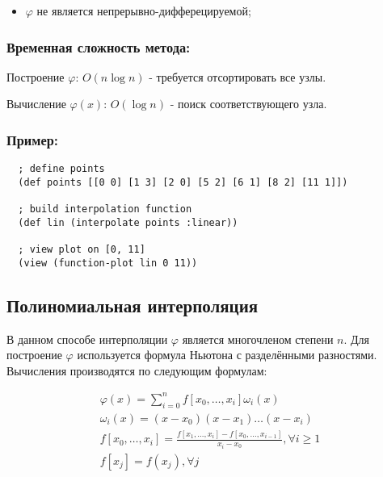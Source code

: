 \begin{itemize}
\item $\varphi$ не является непрерывно-дифферецируемой;
\end{itemize}

\subsubsection{Временная сложность метода:}

Построение $\varphi$: $ O(n \log n)$ - требуется отсортировать все узлы.

Вычисление $\varphi(x)$: $O(\log n)$ - поиск соответствующего узла.

\subsubsection{Пример:}

\begin{verbatim}
  ; define points
  (def points [[0 0] [1 3] [2 0] [5 2] [6 1] [8 2] [11 1]])

  ; build interpolation function
  (def lin (interpolate points :linear))

  ; view plot on [0, 11]
  (view (function-plot lin 0 11))
\end{verbatim}



\subsection{Полиномиальная интерполяция}

В данном способе интерполяции $\varphi$ является многочленом степени $n$. Для построение $\varphi$ используется формула Ньютона с разделёнными разностями. Вычисления производятся по следующим формулам:

\begin{equation}
  \begin{gathered}
    \varphi(x) = \sum_{i=0}^n f[x_0, \dotsc, x_i] \omega_i(x) \\
    \omega_i(x) = (x - x_0)(x - x_1) \dotsc (x - x_i) \\
    f[x_0, \dotsc, x_i] = \frac{f[x_1, \dotsc, x_i] - f[x_0, \dotsc, x_{i-1}]}{x_i - x_0}, \forall i \geq 1 \\
    f[x_j] = f(x_j), \forall j
  \end{gathered}
\end{equation}


